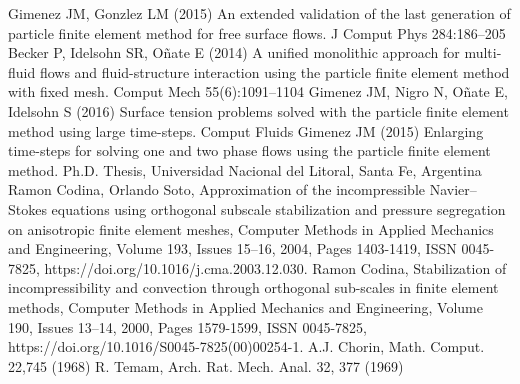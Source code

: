  Gimenez JM, Gonzlez LM (2015) An extended validation of the
last generation of particle finite element method for free surface
flows. J Comput Phys 284:186–205
 Becker P, Idelsohn SR, Oñate E (2014) A unified monolithic
approach for multi-fluid flows and fluid-structure interaction using
the particle finite element method with fixed mesh. Comput Mech
55(6):1091–1104
 Gimenez JM, Nigro N, Oñate E, Idelsohn S (2016) Surface tension
problems solved with the particle finite element method using large
time-steps. Comput Fluids
 Gimenez JM (2015) Enlarging time-steps for solving one and two
phase flows using the particle finite element method. Ph.D. Thesis,
Universidad Nacional del Litoral, Santa Fe, Argentina
 Ramon Codina, Orlando Soto,
Approximation of the incompressible Navier–Stokes equations using orthogonal subscale stabilization and pressure segregation on anisotropic finite element meshes,
Computer Methods in Applied Mechanics and Engineering,
Volume 193, Issues 15–16,
2004,
Pages 1403-1419,
ISSN 0045-7825,
https://doi.org/10.1016/j.cma.2003.12.030.
 Ramon Codina,
Stabilization of incompressibility and convection through orthogonal sub-scales in finite element methods,
Computer Methods in Applied Mechanics and Engineering,
Volume 190, Issues 13–14,
2000,
Pages 1579-1599,
ISSN 0045-7825,
https://doi.org/10.1016/S0045-7825(00)00254-1.
A.J. Chorin, Math. Comput. 22,745 (1968)
R. Temam, Arch. Rat. Mech. Anal. 32, 377 (1969)
